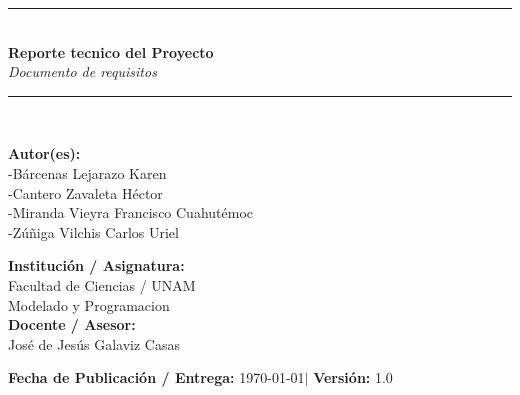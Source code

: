 \documentclass[11pt,a4paper]{article}
\newcommand{\reporttitle}{Reporte tecnico del Proyecto}
\newcommand{\reportsubtitle}{Documento de requisitos}
\newcommand{\reportauthor}{
  -Bárcenas Lejarazo Karen \\[0.1cm]

  -Cantero Zavaleta Héctor \\[0.1cm]

  -Miranda Vieyra Francisco Cuahutémoc \\[0.1cm]

  -Zúñiga Vilchis Carlos Uriel
}
\newcommand{\reportinstitution}{Facultad de Ciencias / UNAM}
\newcommand{\reportcourse}{Modelado y Programacion}
\newcommand{\reportdate}{\today}
\begin{document}
\begin{titlepage}
    \centering
    \vspace*{1.2cm}
    
    {\color{secondary}\rule{\textwidth}{2.5pt}}\\[0.8cm]
    
    {\Huge \textbf{\color{primary}\reporttitle}}\\[0.5cm]
    {\Large \textit{\color{darkgray}\reportsubtitle}}\\[0.8cm]
    
    {\color{secondary}\rule{\textwidth}{1pt}}\\[2.2cm]
    
    \begin{minipage}{0.48\textwidth}
        \begin{flushleft} \large
            \textbf{\color{primary}Autor(es):}\\
            \reportauthor\\[0.2cm]
        \end{flushleft}
    \end{minipage}
    \hfill
    \begin{minipage}{0.48\textwidth}
        \begin{flushright} \large
            \textbf{\color{primary}Institución / Asignatura:}\\
            \reportinstitution\\
            \reportcourse\\[0.2cm]
            \textbf{\color{primary}Docente / Asesor:}\\
            José de Jesús Galaviz Casas
        \end{flushright}
    \end{minipage}
    
    \vfill
    
    \begin{tcolorbox}[colback=lightgray!60, colframe=lightgray!80!black, arc=2mm, width=0.88\textwidth, halign=center]
        \textbf{Fecha de Publicación / Entrega:} \reportdate \quad $\vert$ \quad \textbf{Versión:} 1.0
    \end{tcolorbox}
    
    \vspace{0.8cm}
\end{titlepage}

\end{document}
